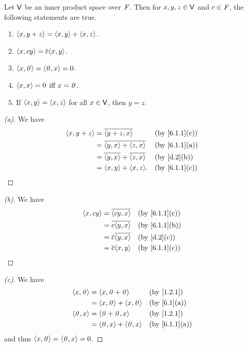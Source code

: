 \begin{thm}\label{6.1}
  Let \(\mathsf{V}\) be an inner product space over \(\mathit{F}\).
  Then for \(x, y, z \in \mathsf{V}\) and \(c \in \mathit{F}\), the following statements are true.
  \begin{enumerate}
    \item \(\left\langle x, y + z\right\rangle = \left\langle x, y\right\rangle + \left\langle x, z\right\rangle\).
    \item \(\inn{x, cy} = \conj{c} \inn{x, y}\).
    \item \(\left\langle x, \mathit{0}\right\rangle = \left\langle\mathit{0}, x\right\rangle = 0\).
    \item \(\left\langle x, x\right\rangle = 0\) iff \(x = \mathit{0}\).
    \item If \(\left\langle x, y\right\rangle = \left\langle x, z\right\rangle\) for all \(x \in \mathsf{V}\), then \(y = z\).
  \end{enumerate}
\end{thm}

\begin{proof}[(a)]
  We have
  \begin{align*}
    \inn{x, y + z} & = \conj{\inn{y + z, x}}                 &  & \text{(by \cref{6.1.1}(c))} \\
                   & = \conj{\inn{y, x} + \inn{z, x}}        &  & \text{(by \cref{6.1.1}(a))} \\
                   & = \conj{\inn{y, x}} + \conj{\inn{z, x}} &  & \text{(by \cref{d.2}(b))}   \\
                   & = \inn{x, y} + \inn{x, z}.              &  & \text{(by \cref{6.1.1}(c))}
  \end{align*}
\end{proof}

\begin{proof}[(b)]
  We have
  \begin{align*}
    \inn{x, cy} & = \conj{\inn{cy, x}}         &  & \text{(by \cref{6.1.1}(c))} \\
                & = \conj{c \inn{y, x}}        &  & \text{(by \cref{6.1.1}(b))} \\
                & = \conj{c} \conj{\inn{y, x}} &  & \text{(by \cref{d.2}(c))}   \\
                & = \conj{c} \inn{x, y}        &  & \text{(by \cref{6.1.1}(c))}
  \end{align*}
\end{proof}

\begin{proof}[(c)]
  We have
  \begin{align*}
    \inn{x, \zv} & = \inn{x, \zv + \zv}          &  & \text{(by \cref{1.2.1})}    \\
                 & = \inn{x, \zv} + \inn{x, \zv} &  & \text{(by \cref{6.1}(a))}   \\
    \inn{\zv, x} & = \inn{\zv + \zv, x}          &  & \text{(by \cref{1.2.1})}    \\
                 & = \inn{\zv, x} + \inn{\zv, x} &  & \text{(by \cref{6.1.1}(a))}
  \end{align*}
  and thus \(\left\langle x, \mathit{0}\right\rangle = \left\langle\mathit{0}, x\right\rangle = 0\).
\end{proof}

